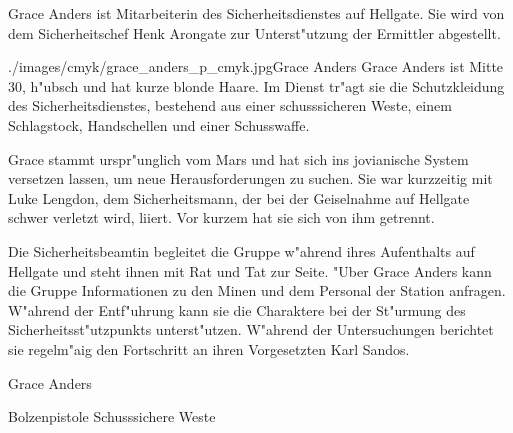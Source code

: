 
Grace Anders ist Mitarbeiterin des Sicherheitsdienstes auf Hellgate. Sie wird von dem Sicherheitschef Henk Arongate zur Unterst"utzung der Ermittler abgestellt.

\begin{sideimagebox}[l]{0.5}{./images/cmyk/grace_anders_p_cmyk.jpg}{Grace Anders}
    Grace Anders ist Mitte 30, h"ubsch und hat kurze blonde Haare. Im Dienst tr"agt sie die Schutzkleidung des Sicherheitsdienstes, bestehend aus einer schusssicheren Weste, einem Schlagstock, Handschellen und einer Schusswaffe.

    Grace stammt urspr"unglich vom Mars und hat sich ins jovianische System versetzen lassen, um neue Herausforderungen zu suchen. Sie war kurzzeitig mit Luke Lengdon, dem Sicherheitsmann, der bei der Geiselnahme auf Hellgate schwer verletzt wird, liiert. Vor kurzem hat sie sich von ihm getrennt.
    
    Die Sicherheitsbeamtin begleitet die Gruppe w"ahrend ihres Aufenthalts auf Hellgate und steht ihnen mit Rat und Tat zur Seite. "Uber Grace Anders kann die Gruppe Informationen zu den Minen und dem Personal der Station anfragen. W"ahrend der Entf"uhrung kann sie die Charaktere bei der St"urmung des Sicherheitsst"utzpunkts unterst"utzen. W"ahrend der Untersuchungen berichtet sie regelm"a\3ig den Fortschritt an ihren Vorgesetzten Karl Sandos.
\end{sideimagebox}

\begin{nscsheet}{Grace Anders}
    \nscstats[ATT=2,AGG=2,COM=2]
    \nscruler
    \begin{nscinventory}
        \nscitem[Waffen] Bolzenpistole
        \nscitem[R"ustung] Schusssichere Weste
    \end{nscinventory}
\end{nscsheet}

